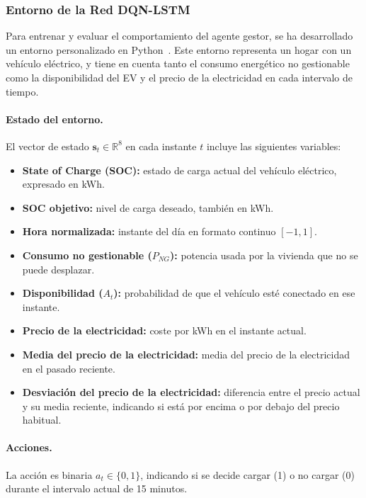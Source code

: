 \subsubsection{Entorno de la Red DQN-LSTM}
Para entrenar y evaluar el comportamiento del agente gestor, se ha desarrollado un entorno 
personalizado en Python~\cite{python2024language}. Este entorno representa un hogar con un vehículo 
eléctrico, y tiene en cuenta tanto el consumo energético no gestionable como la disponibilidad  del 
EV y el precio de la electricidad en cada intervalo de tiempo.

\paragraph{Estado del entorno.}
El vector de estado \(\mathbf{s}_t \in \mathbb{R}^8\) en cada instante \(t\) incluye las siguientes 
variables:
\begin{itemize}
    \item \textbf{State of Charge (SOC):} estado de carga actual del vehículo eléctrico, expresado 
    en kWh.
    \item \textbf{SOC objetivo:} nivel de carga deseado, también en kWh.
    \item \textbf{Hora normalizada:} instante del día en formato continuo \([-1, 1]\).
    \item \textbf{Consumo no gestionable (\(P_{NG}\)):} potencia usada por la vivienda que no se 
    puede desplazar.
    \item \textbf{Disponibilidad (\(A_t\)):} probabilidad de que el vehículo esté conectado en ese 
    instante.
    \item \textbf{Precio de la electricidad:} coste por kWh en el instante actual.
    \item \textbf{Media del precio de la electricidad:} media del precio de la electricidad en el 
    pasado reciente.
    \item \textbf{Desviación del precio de la electricidad:} diferencia entre el precio actual y su 
    media reciente, indicando si está por encima o por debajo del precio habitual.
\end{itemize}

\paragraph{Acciones.} 
La acción es binaria \(a_t \in \{0, 1\}\), indicando si se decide cargar (1) o no cargar (0) durante 
el intervalo actual de 15 minutos.

